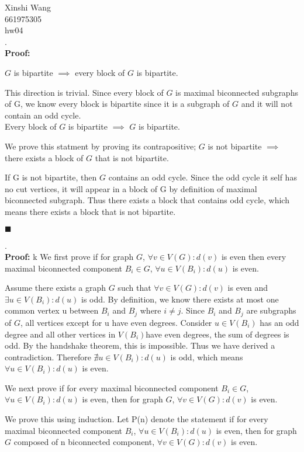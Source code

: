 \documentclass[12pt]{article}
\begin{document}
	\noindent Xinshi Wang\\
	661975305\\
	hw04\\
	
	.\\
	\textbf{Proof:}
	
	$G$ is bipartite $\implies$ every block of $G$ is bipartite.
	
	This direction is trivial. Since every block of $G$ is maximal biconnected subgraphs of G, we know every block is bipartite since it is a subgraph of $G$ and it will not contain an odd cycle.\\
	
	Every block of $G$ is bipartite $\implies$ $G$ is bipartite.
	
	We prove this statment by proving its contrapositive; $G$ is not bipartite $\implies$ there exists a block of $G$ that is not bipartite.
	
	If G is not bipartite, then $G$ contains an odd cycle. Since the odd cycle it self has no cut vertices, it will appear in a block of G by definition of maximal biconnected subgraph. Thus there exists a block that contains odd cycle, which means there exists a block that is not bipartite. 
	
	\hfill $\blacksquare$ 
	 
	.\\
	\textbf{Proof:}
	k
	We first prove if for graph $G$, $\forall v\in V(G) : d(v)$ is even then every maximal biconnected component $B_i \in G$, $\forall u\in V(B_i) : d(u)$ is even.
	
	Assume there exists a graph $G$ such that $\forall v\in V(G) : d(v)$ is even and $\exists u\in V(B_i) : d(u)$ is odd. By definition, we know there exists at most one common vertex u between $B_i$ and $B_j$ where $i \neq j$. Since $B_i$ and $B_j$ are subgraphs of $G$, all vertices except for u have even degrees. Consider $u \in V(B_i)$ has an odd degree and all other vertices in $V(B_i)$have even degrees, the sum of degrees is odd. By the handshake theorem, this is impossible. Thus we have derived a contradiction. Therefore $\nexists u\in V(B_i) : d(u)$ is odd, which means $\forall u\in V(B_i) : d(u)$ is even.
	
	We next prove if for every maximal biconnected component $B_i \in G$, $\forall u\in V(B_i) : d(u)$ is even, then for graph $G$, $\forall v\in V(G) : d(v)$ is even.
	
	We prove this using induction. Let P(n) denote the statement if for every maximal biconnected component $B_i$, $\forall u\in V(B_i) : d(u)$ is even, then for graph $G$ composed of n biconnected component, $\forall v\in V(G) : d(v)$ is even. 
	
\end{document}
